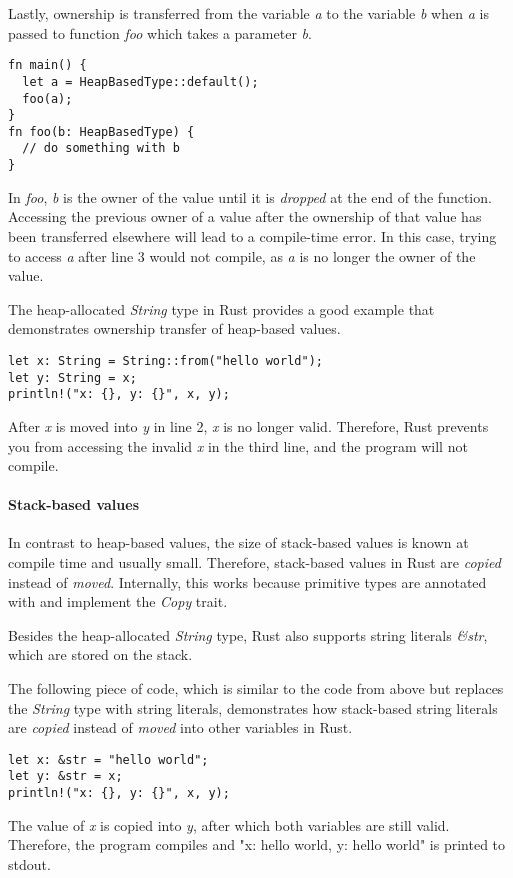 \documentclass[sigplan,11pt,nonacm]{acmart}
\begin{document}
Lastly, ownership is transferred from the variable \emph{a} to the variable \emph{b} when \emph{a} is passed to function \emph{foo} which takes a parameter \emph{b}.
\begin{lstlisting}
fn main() {
  let a = HeapBasedType::default();
  foo(a);
}
fn foo(b: HeapBasedType) {
  // do something with b
}
\end{lstlisting}
In \emph{foo}, \emph{b} is the owner of the value until it is \emph{dropped} at the end of the function.
Accessing the previous owner of a value after the ownership of that value has been transferred elsewhere will lead to a compile-time error.
In this case, trying to access \emph{a} after line 3 would not compile, as \emph{a} is no longer the owner of the value.

The heap-allocated \emph{String} type in Rust provides a good example that demonstrates ownership transfer of heap-based values.
\begin{lstlisting}
let x: String = String::from("hello world");
let y: String = x;
println!("x: {}, y: {}", x, y);
\end{lstlisting}
After \emph{x} is moved into \emph{y} in line 2, \emph{x} is no longer valid.
Therefore, Rust prevents you from accessing the invalid \emph{x} in the third line, and the program will not compile.


\paragraph{Stack-based values}

In contrast to heap-based values, the size of stack-based values is known at compile time and usually small.
Therefore, stack-based values in Rust are \emph{copied} instead of \emph{moved}.
Internally, this works because primitive types are annotated with and implement the \emph{Copy} trait.

Besides the heap-allocated \emph{String} type, Rust also supports string literals \emph{\&str}, which are stored on the stack.

The following piece of code, which is similar to the code from above but replaces the \emph{String} type with string literals, demonstrates how stack-based string literals are \emph{copied} instead of \emph{moved} into other variables in Rust.
\begin{lstlisting}
let x: &str = "hello world";
let y: &str = x;
println!("x: {}, y: {}", x, y);
\end{lstlisting}
The value of \emph{x} is copied into \emph{y}, after which both variables are still valid.
Therefore, the program compiles and "x: hello world, y: hello world" is printed to stdout.
\cite{rust-book}
\end{document}
